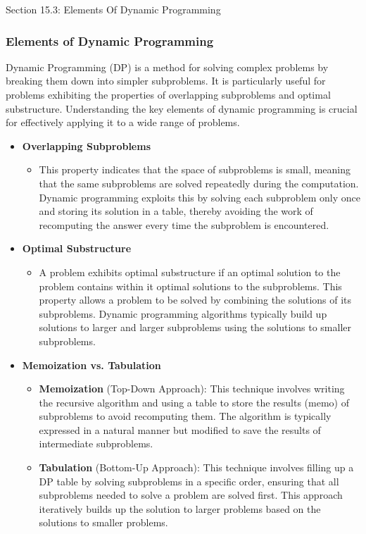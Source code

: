 \begin{notes}{Section 15.3: Elements Of Dynamic Programming}
    \subsubsection*{Elements of Dynamic Programming}

    Dynamic Programming (DP) is a method for solving complex problems by breaking them down into simpler subproblems. It is particularly useful for problems exhibiting the properties of overlapping 
    subproblems and optimal substructure. Understanding the key elements of dynamic programming is crucial for effectively applying it to a wide range of problems.
    
    \begin{itemize}
        \item \textbf{Overlapping Subproblems}
        \begin{itemize}
            \item This property indicates that the space of subproblems is small, meaning that the same subproblems are solved repeatedly during the computation. Dynamic programming exploits this by 
            solving each subproblem only once and storing its solution in a table, thereby avoiding the work of recomputing the answer every time the subproblem is encountered.
        \end{itemize}
        
        \item \textbf{Optimal Substructure}
        \begin{itemize}
            \item A problem exhibits optimal substructure if an optimal solution to the problem contains within it optimal solutions to the subproblems. This property allows a problem to be solved by 
            combining the solutions of its subproblems. Dynamic programming algorithms typically build up solutions to larger and larger subproblems using the solutions to smaller subproblems.
        \end{itemize}
        
        \item \textbf{Memoization vs. Tabulation}
        \begin{itemize}
            \item \textbf{Memoization} (Top-Down Approach): This technique involves writing the recursive algorithm and using a table to store the results (memo) of subproblems to avoid recomputing 
            them. The algorithm is typically expressed in a natural manner but modified to save the results of intermediate subproblems.
            \item \textbf{Tabulation} (Bottom-Up Approach): This technique involves filling up a DP table by solving subproblems in a specific order, ensuring that all subproblems needed to solve a 
            problem are solved first. This approach iteratively builds up the solution to larger problems based on the solutions to smaller problems.
        \end{itemize}
        

\end{itemize}
\end{notes}
